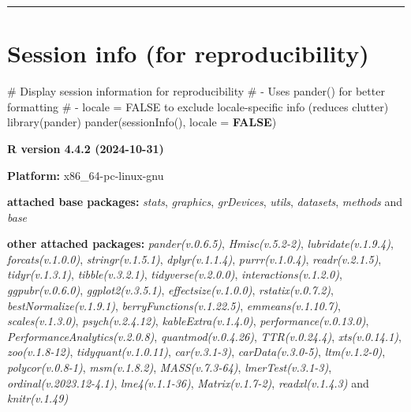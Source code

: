 \documentclass[
  bookmarksnumbered]{article}
\newenvironment{Shaded}{\begin{snugshade}}{\end{snugshade}}
\newcommand{\AttributeTok}[1]{\textcolor[rgb]{0.80,0.80,0.80}{#1}}
\newcommand{\CommentTok}[1]{\textcolor[rgb]{0.50,0.62,0.50}{#1}}
\newcommand{\ConstantTok}[1]{\textcolor[rgb]{0.86,0.64,0.64}{\textbf{#1}}}
\newcommand{\FunctionTok}[1]{\textcolor[rgb]{0.94,0.94,0.56}{#1}}
\newcommand{\NormalTok}[1]{\textcolor[rgb]{0.80,0.80,0.80}{#1}}
\begin{document}
\begin{center}\rule{0.5\linewidth}{0.5pt}\end{center}

\section{Session info (for reproducibility)}\label{session}

\begin{Shaded}
\begin{Highlighting}[]
\CommentTok{\# Display session information for reproducibility}
\CommentTok{\# {-} Uses \textasciigrave{}pander()\textasciigrave{} for better formatting}
\CommentTok{\# {-} \textasciigrave{}locale = FALSE\textasciigrave{} to exclude locale{-}specific info (reduces clutter)}
\FunctionTok{library}\NormalTok{(pander)}
\FunctionTok{pander}\NormalTok{(}\FunctionTok{sessionInfo}\NormalTok{(), }\AttributeTok{locale =} \ConstantTok{FALSE}\NormalTok{)}
\end{Highlighting}
\end{Shaded}

\textbf{R version 4.4.2 (2024-10-31)}

\textbf{Platform:} x86\_64-pc-linux-gnu

\textbf{attached base packages:}
\emph{stats}, \emph{graphics}, \emph{grDevices}, \emph{utils}, \emph{datasets}, \emph{methods} and \emph{base}

\textbf{other attached packages:}
\emph{pander(v.0.6.5)}, \emph{Hmisc(v.5.2-2)}, \emph{lubridate(v.1.9.4)}, \emph{forcats(v.1.0.0)}, \emph{stringr(v.1.5.1)}, \emph{dplyr(v.1.1.4)}, \emph{purrr(v.1.0.4)}, \emph{readr(v.2.1.5)}, \emph{tidyr(v.1.3.1)}, \emph{tibble(v.3.2.1)}, \emph{tidyverse(v.2.0.0)}, \emph{interactions(v.1.2.0)}, \emph{ggpubr(v.0.6.0)}, \emph{ggplot2(v.3.5.1)}, \emph{effectsize(v.1.0.0)}, \emph{rstatix(v.0.7.2)}, \emph{bestNormalize(v.1.9.1)}, \emph{berryFunctions(v.1.22.5)}, \emph{emmeans(v.1.10.7)}, \emph{scales(v.1.3.0)}, \emph{psych(v.2.4.12)}, \emph{kableExtra(v.1.4.0)}, \emph{performance(v.0.13.0)}, \emph{PerformanceAnalytics(v.2.0.8)}, \emph{quantmod(v.0.4.26)}, \emph{TTR(v.0.24.4)}, \emph{xts(v.0.14.1)}, \emph{zoo(v.1.8-12)}, \emph{tidyquant(v.1.0.11)}, \emph{car(v.3.1-3)}, \emph{carData(v.3.0-5)}, \emph{ltm(v.1.2-0)}, \emph{polycor(v.0.8-1)}, \emph{msm(v.1.8.2)}, \emph{MASS(v.7.3-64)}, \emph{lmerTest(v.3.1-3)}, \emph{ordinal(v.2023.12-4.1)}, \emph{lme4(v.1.1-36)}, \emph{Matrix(v.1.7-2)}, \emph{readxl(v.1.4.3)} and \emph{knitr(v.1.49)}
\end{document}
